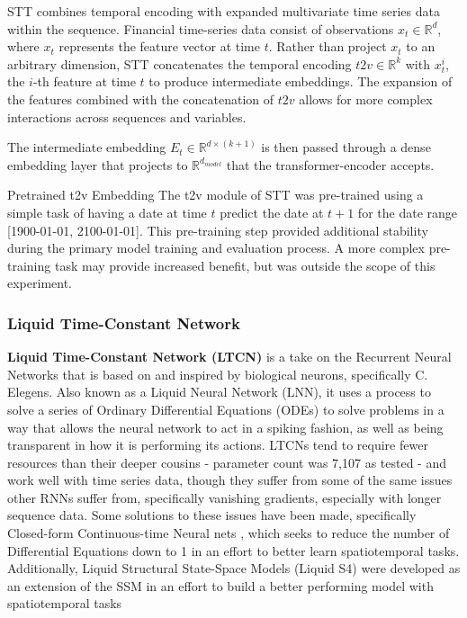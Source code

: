 \documentclass[10pt,twocolumn,letterpaper]{article}
\begin{document}
STT combines temporal encoding with expanded multivariate time series data within the sequence. Financial time-series data consist of observations $x_t \in \mathbb{R}^d$, where $x_t$ represents the feature vector at time $t$. Rather than project $x_t$ to an arbitrary dimension, STT concatenates the temporal encoding $t2v \in \mathbb{R}^k$ with $x^i_t$, the $i$-th feature at time $t$ to produce intermediate embeddings. The expansion of the features combined with the concatenation of $t2v$ allows for more complex interactions across sequences and variables.

            The intermediate embedding $E_t \in \mathbb{R}^{d \times (k + 1)}$ is then passed through a dense embedding layer that projects to $\mathbb{R}^{d_{model}}$ that the transformer-encoder accepts.

Pretrained t2v Embedding
The t2v module of STT was pre-trained using a simple task of having a date at time $t$ predict the date at $t+1$ for the date range [1900-01-01, 2100-01-01]. This pre-training step provided additional stability during the primary model training and evaluation process. A more complex pre-training task may provide increased benefit, but was outside the scope of this experiment.

\subsubsection{Liquid Time-Constant Network}

\textbf{Liquid Time-Constant Network (LTCN)} \cite{hasani_liquid_2020} is a take on the Recurrent Neural Networks that is based on and inspired by biological neurons, specifically C. Elegens. Also known as a Liquid Neural Network (LNN), it uses a process to solve a series of Ordinary Differential Equations (ODEs) to solve problems in a way that allows the neural network to act in a spiking fashion, as well as being transparent in how it is performing its actions. LTCNs tend to require fewer resources than their deeper cousins - parameter count was 7,107 as tested - and work well with time series data, though they suffer from some of the same issues other RNNs suffer from, specifically vanishing gradients, especially with longer sequence data. Some solutions to these issues have been made, specifically Closed-form Continuous-time Neural nets \cite{CfC_LTC}, which seeks to reduce the number of Differential Equations down to 1 in an effort to better learn spatiotemporal tasks. Additionally, Liquid Structural State-Space Models (Liquid S4) were developed as an extension of the SSM in an effort to build a better performing model with spatiotemporal tasks \cite{hasani2022liquid}
\end{document}
